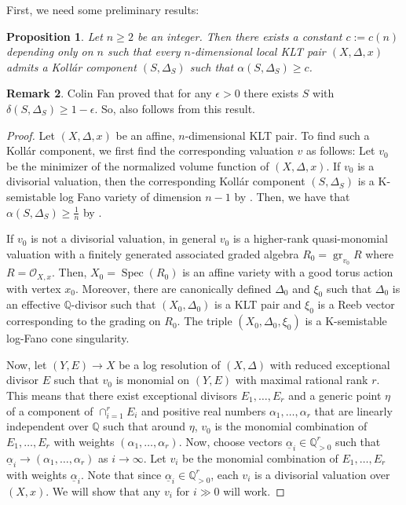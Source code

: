 \documentclass[11pt,reqno]{amsart}
\newcommand{\Q}{\mathbb{Q}}
\newcommand{\cO}{\mathcal{O}}
\DeclareMathOperator{\Spec}{Spec}
\DeclareMathOperator{\gr}{gr}
\numberwithin{equation}{section}
\newtheorem{prop} {Proposition} [section]
\theoremstyle{definition}
\newtheorem{rem}[prop] {Remark}
\begin{document}
First, we need some preliminary results:

\begin{prop} \label{prop:boundonalphaofKollarcomponent}
    Let $n \geq 2$ be an integer. Then there exists a constant $c := c(n)$ depending only on $n$ such that every $n$-dimensional local KLT pair $(X, \Delta,x)$ admits a Koll\'ar component $(S, \Delta_S)$ such that $\alpha(S, \Delta_S) \geq c$. 
\end{prop}

\begin{rem}
    Colin Fan proved that for any $\epsilon>0$ there exists $S$ with $\delta(S,\Delta_S)\geq 1-\epsilon$. So,  also follows from this result.
\end{rem}

\begin{proof}
        Let $(X, \Delta, x)$ be an affine, $n$-dimensional KLT pair. To find such a Koll\'ar component, we first find the corresponding valuation $v$ as follows: Let $v_0$ be the minimizer of the normalized volume function of $(X, \Delta, x)$. If $v_0$ is a divisorial valuation, then the corresponding Koll\'ar component $(S, \Delta_S)$ is a K-semistable log Fano variety of dimension $n -1$ by \cite[Theorem A]{LiXuStabilityofvaluations}. Then, we have that $\alpha(S, \Delta_S) \geq \frac{1}{n}$ by \cite[Theorem 3.5]{FujitaOdakadeltainvariant}.
        
        If $v_0$ is not a divisorial valuation, in general $v_0$ is a higher-rank quasi-monomial valuation with a finitely generated associated graded algebra $R_0 = \gr_{v_0}  R$ where $R = \cO_{X,x}$. Then, $X_0 = \Spec(R_0)$ is an affine variety with a good torus action with vertex $x_0$. Moreover,  there are canonically defined $\Delta_0$ and $\xi_0$ such that $\Delta_0$ is an effective $\Q$-divisor such that $(X_0, \Delta_0)$ is a KLT pair and $\xi_0$ is a Reeb vector corresponding to the grading on $R_0$. The triple $(X_0, \Delta_0, \xi_0)$  is a K-semistable log-Fano cone singularity.

        Now, let $(Y, E) \to X$ be a log resolution of $(X, \Delta)$ with reduced exceptional divisor $E$ such that $v_0$ is monomial on $(Y,E)$ with maximal rational rank $r$. This means that there exist exceptional divisors $E_1, \dots, E_r$ and a generic point $\eta$ of a component of $\cap_{i = 1} ^r E_i$ and positive real numbers $\alpha_1, \dots, \alpha_r$ that are linearly independent over $\Q$ such that around $\eta$, $v_0$ is the monomial combination of $E_1, \dots, E_r$ with weights $(\alpha_1, \dots, \alpha_r)$. Now, choose vectors $\underline{\alpha}_i \in \Q^r _{ > 0}$ such that $ \underline{\alpha}_i \to (\alpha_1, \dots, \alpha_r)$ as $i \to \infty$. Let $v_i$ be the monomial combination of $E_1, \dots, E_r$ with weights $\underline{\alpha}_i$. Note that since $\underline{\alpha}_i \in \Q^r _{>0}$, each $v_i$ is a divisorial valuation over $(X,x)$. We will show that any $v_i $ for $i \gg 0 $ will work.


\end{proof}
\end{document}
